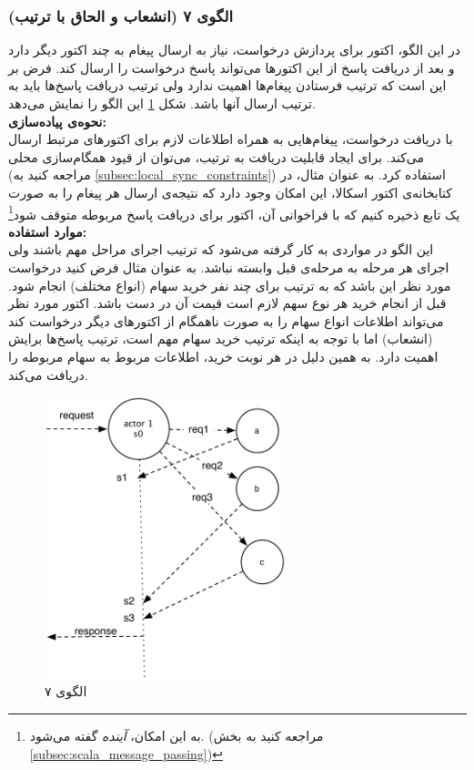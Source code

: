 \subsubsection{الگوی ۷ (انشعاب و الحاق با ترتیب)}
در این الگو، اکتور برای پردازش درخواست، نیاز به ارسال پیغام به چند اکتور دیگر دارد و بعد از دریافت پاسخ از این اکتورها می‌تواند پاسخ درخواست را ارسال کند. فرض بر این است که ترتیب فرستادن پیغام‌ها‌‌ اهمیت ندارد ولی ترتیب دریافت پاسخ‌‌ها باید به ترتیب ارسال آنها باشد. شکل \ref{fig:Patterns_statefull_7} این الگو را نمایش می‌دهد.\\
\textbf{نحوه‌ی پیاده‌سازی:}\\
با دریافت درخواست، پیغام‌هایی به همراه اطلاعات لازم برای اکتورهای مرتبط ارسال می‌کند. برای ایجاد قابلیت دریافت به ترتیب، می‌توان از قیود‌ همگام‌سازی محلی (مراجعه کنید به \ref{subsec:local_sync_constraints}) استفاده کرد. به عنوان مثال، در کتابخانه‌ی اکتور اسکالا، این امکان وجود دارد که نتیجه‌ی ارسال هر پیغام را به صورت یک تابع ذخیره کنیم که با فراخوانی آن، اکتور برای دریافت پاسخ مربوطه متوقف شود\footnote{به این امکان، \textit{آینده}  گفته می‌شود. (مراجعه کنید به بخش \ref{subsec:scala_message_passing}) }\\
\textbf{موارد استفاده:}\\
این الگو در مواردی به کار گرفته می‌شود که ترتیب اجرای مراحل مهم باشند ولی اجرای هر مرحله به مرحله‌ی قبل وابسته نباشد. به عنوان مثال فرض کنید درخواست مورد نظر این باشد که به ترتیب برای چند نفر خرید سهام (انواع مختلف) انجام شود. قبل از انجام خرید هر نوع سهم  لازم است قیمت آن در دست باشد. اکتور مورد نظر می‌تواند اطلاعات انواع سهام را به صورت ناهمگام از اکتورهای دیگر درخواست کند (انشعاب) اما با توجه به اینکه ترتیب خرید سهام مهم است، ترتیب پاسخ‌ها برایش اهمیت دارد. به همین دلیل در هر نوبت خرید، اطلاعات مربوط به سهام مربوطه را دریافت می‌کند.
\begin{figure}[ht]
    \begin{center}
	\includegraphics[width=7cm]{4-ProposedFramework/Figures/Patterns_statelfull_fj_sequenced_receive.pdf}
    \end{center}
    \caption{\label{fig:Patterns_statefull_7}الگوی ۷}
\end{figure}
\FloatBarrier

